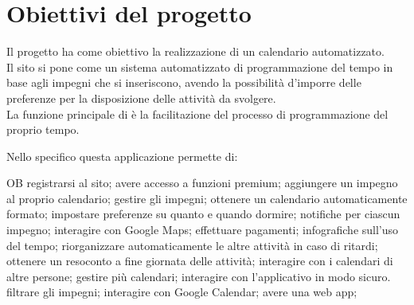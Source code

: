 \section{Obiettivi del progetto}
\label{sec:ObiettiviProgetto}
Il progetto ha come obiettivo la realizzazione di un calendario automatizzato.\\
Il sito si pone come un sistema automatizzato di programmazione del tempo in base agli impegni che si inseriscono, avendo la possibilità d'imporre delle preferenze per la disposizione delle attività da svolgere.\\
La funzione principale di \nome è la facilitazione del processo di programmazione del proprio tempo.

\vspace{0.5cm}

Nello specifico questa applicazione permette di:
\begin {mylist} {OB} 
       registrarsi al sito;
       avere accesso a funzioni premium; 
       aggiungere un impegno al proprio calendario;
       gestire gli impegni; 
       ottenere un calendario automaticamente formato; 
       impostare preferenze su quanto e quando dormire;
       notifiche per ciascun impegno; 
       interagire con Google Maps; 
       effettuare pagamenti;
       infografiche sull'uso del tempo;
       riorganizzare automaticamente le altre attività in caso di ritardi;
       ottenere un resoconto a fine giornata delle attività;
       interagire con i calendari di altre persone;
       gestire più calendari;
       interagire con l'applicativo in modo sicuro. 
       filtrare gli impegni; 
       interagire con Google Calendar;
       avere una web app;
      
\end{mylist}
